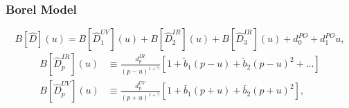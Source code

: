 \documentclass{beamer}
\begin{document}
\begin{frame}
  \frametitle{Borel Model}
  \begin{equation}
    \label{eq:borelModel}
    B[\widehat D](u) = B[\widehat D_1^{UV}](u) + B[\widehat D_2^{IR}](u) + B[\widehat D_3^{IR}](u) + d_0^{PO} + d_1^{PO}u,
  \end{equation}
  \begin{align}
    B[\widehat D_p^{IR}](u)
    &\equiv \frac{d_p^{IR}}{(p-u)^{1+\tilde \gamma}}
      \left[  1 + \tilde b_1(p-u) + \tilde b_2(p-u)^2 + \dots \right] \\
    B[\widehat D_p^{UV}](u) &\equiv \frac{d_p^{UV}}{(p+u)^{1+\bar\gamma}}\left[1 + \bar b_1(p+u) + \bar b_2(p+u)^2 \right],
  \end{align}
  \cite{Beneke2008}
\end{frame}
\end{document}
